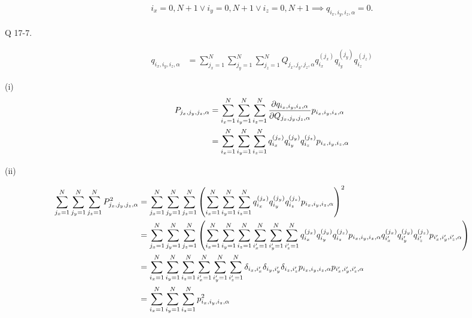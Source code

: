 \documentclass[a4paper,dvipdfmx]{jsarticle}
\theoremstyle{definition}
\begin{document}
\begin{align}
  i_x = 0, N+1 \lor i_y = 0, N+1 \lor i_z = 0, N+1 \implies q_{i_x,i_y,i_z,\alpha} = 0.
\end{align}

\begin{itembox}[l]{Q 17-7.}
\end{itembox}

\begin{align}
  q_{i_x,i_y,i_z,\alpha} & = \sum_{j_x=1}^{N}\sum_{j_y=1}^{N}\sum_{j_z=1}^{N}Q_{j_x,j_y,j_z,\alpha}q_{i_x}^{(j_x)}q_{i_y}^{(j_y)}q_{i_z}^{(j_z)}
\end{align}

(i)
\begin{align}
  P_{j_x,j_y,j_z,\alpha} & = \sum_{i_x=1}^{N}\sum_{i_y=1}^{N}\sum_{i_z=1}^{N}\pdv{q_{i_x,i_y,i_z,\alpha}}{Q_{j_x,j_y,j_z,\alpha}}p_{i_x,i_y,i_z,\alpha} \\
                         & = \sum_{i_x=1}^{N}\sum_{i_y=1}^{N}\sum_{i_z=1}^{N}q_{i_x}^{(j_x)}q_{i_y}^{(j_y)}q_{i_z}^{(j_z)}p_{i_x,i_y,i_z,\alpha}
\end{align}

(ii)

\begin{align}
  \sum_{j_x=1}^{N}\sum_{j_y=1}^{N}\sum_{j_z=1}^{N}P_{j_x,j_y,j_z,\alpha}^2 & = \sum_{j_x=1}^{N}\sum_{j_y=1}^{N}\sum_{j_z=1}^{N}\qty(\sum_{i_x=1}^{N}\sum_{i_y=1}^{N}\sum_{i_z=1}^{N}q_{i_x}^{(j_x)}q_{i_y}^{(j_y)}q_{i_z}^{(j_z)}p_{i_x,i_y,i_z,\alpha})^2                                                                                                                           \\
                                                                           & = \sum_{j_x=1}^{N}\sum_{j_y=1}^{N}\sum_{j_z=1}^{N}\qty(\sum_{i_x=1}^{N}\sum_{i_y=1}^{N}\sum_{i_z=1}^{N}\sum_{i_x'=1}^{N}\sum_{i_y'=1}^{N}\sum_{i_z'=1}^{N}q_{i_x}^{(j_x)}q_{i_y}^{(j_y)}q_{i_z}^{(j_z)}p_{i_x,i_y,i_z,\alpha}q_{i_x'}^{(j_x)}q_{i_y'}^{(j_y)}q_{i_z'}^{(j_z)}p_{i_x',i_y',i_z',\alpha}) \\
                                                                           & = \sum_{i_x=1}^{N}\sum_{i_y=1}^{N}\sum_{i_z=1}^{N}\sum_{i_x'=1}^{N}\sum_{i_y'=1}^{N}\sum_{i_z'=1}^{N}\delta_{i_x,i_x'}\delta_{i_y,i_y'}\delta_{i_z,i_z'}p_{i_x,i_y,i_z,\alpha}p_{i_x',i_y',i_z',\alpha}                                                                                                 \\
                                                                           & = \sum_{i_x=1}^{N}\sum_{i_y=1}^{N}\sum_{i_z=1}^{N}p_{i_x,i_y,i_z,\alpha}^2
\end{align}
\end{document}
